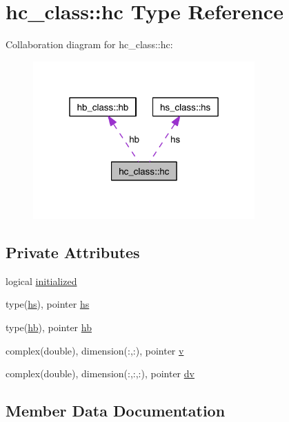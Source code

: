 \hypertarget{structhc__class_1_1hc}{}\section{hc\+\_\+class\+:\+:hc Type Reference}
\label{structhc__class_1_1hc}


Collaboration diagram for hc\+\_\+class\+:\+:hc\+:\nopagebreak
\begin{figure}[H]
\begin{center}
\leavevmode
\includegraphics[width=241pt]{structhc__class_1_1hc__coll__graph}
\end{center}
\end{figure}
\subsection*{Private Attributes}
\begin{DoxyCompactItemize}
\item 
logical \hyperlink{structhc__class_1_1hc_a89151c80172cb67d68a44b6264afb8a7}{initialized}
\item 
type(\hyperlink{strucths__class_1_1hs}{hs}), pointer \hyperlink{structhc__class_1_1hc_a09dd08ce79ada0e7a9f7c3eb8a2a50f5}{hs}
\item 
type(\hyperlink{structhb__class_1_1hb}{hb}), pointer \hyperlink{structhc__class_1_1hc_a87af1d9489543e7f6a7501ea8468f763}{hb}
\item 
complex(double), dimension(\+:,\+:), pointer \hyperlink{structhc__class_1_1hc_ad3bab6b18bd729b4e1c49f7d14c0b4f9}{v}
\item 
complex(double), dimension(\+:,\+:,\+:), pointer \hyperlink{structhc__class_1_1hc_ae44fb8b1351b045650148c174099a1a1}{dv}
\end{DoxyCompactItemize}


\subsection{Member Data Documentation}
\mbox{\label{structhc__class_1_1hc_ae44fb8b1351b045650148c174099a1a1}} 

